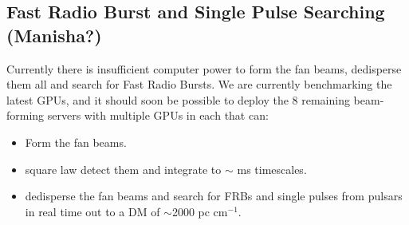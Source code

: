 \subsection{Fast Radio Burst and Single Pulse Searching (Manisha?)}

Currently there is insufficient computer power to form the fan beams, dedisperse them all and search for Fast Radio Bursts. We are currently benchmarking the latest GPUs, and it should soon be possible to deploy the 8 remaining beam-forming servers with multiple GPUs in each that can:
\begin{itemize}
\item Form the fan beams.
\item square law detect them and integrate to $\sim$ ms timescales.
\item dedisperse the fan beams and search for FRBs and single pulses from pulsars in real time out to a DM of $\sim$2000 pc cm$^{-1}$.
\end{itemize}

